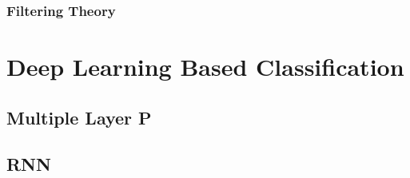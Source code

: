 \subsubsection{Filtering Theory}

\section{Deep Learning Based Classification}

\subsection{Multiple Layer P}
\subsection{RNN}




